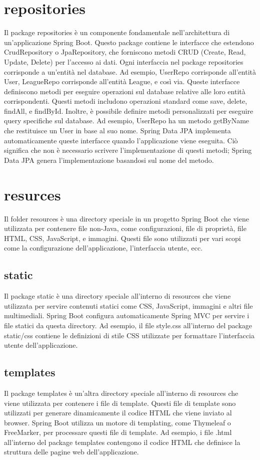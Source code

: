 \documentclass[twoside,openright,titlepage,fleqn,headinclude,12pt,a4paper,BCOR=5mm,footinclude]{scrbook}
\begin{document}
\section{repositories}
Il package repositories è un componente fondamentale nell'architettura di un'applicazione Spring Boot. Questo package contiene le interfacce che estendono CrudRepository o JpaRepository, che forniscono metodi CRUD (Create, Read, Update, Delete) per l'accesso ai dati.  Ogni interfaccia nel package repositories corrisponde a un'entità nel database. Ad esempio, UserRepo corrisponde all'entità User, LeagueRepo corrisponde all'entità League, e così via. Queste interfacce definiscono metodi per eseguire operazioni sul database relative alle loro entità corrispondenti.  Questi metodi includono operazioni standard come save, delete, findAll, e findById. Inoltre, è possibile definire metodi personalizzati per eseguire query specifiche sul database. Ad esempio, UserRepo ha un metodo getByName che restituisce un User in base al suo nome.  Spring Data JPA implementa automaticamente queste interfacce quando l'applicazione viene eseguita. Ciò significa che non è necessario scrivere l'implementazione di questi metodi; Spring Data JPA genera l'implementazione basandosi sul nome del metodo.

\section{resurces}
Il folder resources è una directory speciale in un progetto Spring Boot che viene utilizzata per contenere file non-Java, come configurazioni, file di proprietà, file HTML, CSS, JavaScript, e immagini. Questi file sono utilizzati per vari scopi come la configurazione dell'applicazione, l'interfaccia utente, ecc.  
\subsection{static}
Il package static è una directory speciale all'interno di resources che viene utilizzata per servire contenuti statici come CSS, JavaScript, immagini e altri file multimediali. Spring Boot configura automaticamente Spring MVC per servire i file statici da questa directory. Ad esempio, il file style.css all'interno del package static/css contiene le definizioni di stile CSS utilizzate per formattare l'interfaccia utente dell'applicazione.  
\subsection{templates}
Il package templates è un'altra directory speciale all'interno di resources che viene utilizzata per contenere i file di template. Questi file di template sono utilizzati per generare dinamicamente il codice HTML che viene inviato al browser. Spring Boot utilizza un motore di templating, come Thymeleaf o FreeMarker, per processare questi file di template. Ad esempio, i file .html all'interno del package templates contengono il codice HTML che definisce la struttura delle pagine web dell'applicazione.
\end{document}
